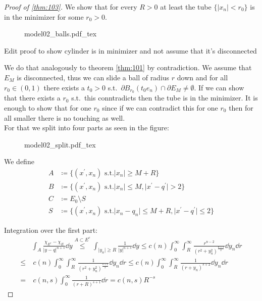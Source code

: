 \begin{proof}[Proof of \cref{thm:103}]
	We show that for every \( R > 0 \) at least the tube \( \{ \lvert x_n \rvert < r_0 \}
	\) is in the minimizer for some \( r_0 > 0 \). \\
	\begin{figure}[h]
		\centering
		\def\svgwidth{0.5\textwidth}
		{model02_balls.pdf_tex}
		\caption{}
		\label{fig:105}
	\end{figure}
	\begin{TODO}
		Edit proof to show cylinder is in minimizer and not assume that it's disconnected
	\end{TODO}
	We do that analogously to theorem \cref{thm:101} by contradiction. We assume that \(
	E_M \) is disconnected, thus we can slide a ball of radius \( r \) down and for all \(
	r_0 \in (0,1) \) there exists a \( t_0 > 0 \) s.t.\ \( \partial B_{r_0}(t_0 e_n) \cap
	\partial E_M \neq \emptyset \). If we can show that there exists a \( r_0 \) s.t.\
	this conntradicts then the tube is in the minimizer. It is enough to show that for one
	\( r_0 \) since if we can contradict this for one \( r_0 \) then for all smaller there
	is no touching as well. \\
	For that we split into four parts as seen in the figure:

	\begin{figure}[h]
		\centering
		\def\svgwidth{0.5\textwidth}
		{model02_split.pdf_tex}
		\caption{}
		\label{fig:106}
	\end{figure}
	We define
	\begin{align*}
		A & \coloneqq \{(x^\prime,x_n) \text{ s.t.} \lvert x_n \rvert \geq M+R \} \\
		B & \coloneqq \{(x^\prime,x_n) \text{ s.t.} \lvert x_n \rvert \leq M, \lvert x^\prime -q^\prime \rvert > 2 \} \\
		C & \coloneqq E_0 \setminus S \\
		S & \coloneqq \{ (x^\prime,x_n) \text{ s.t.} \lvert x_n - q_n \rvert \leq M+R, \lvert x^\prime -q^\prime \rvert \leq 2\}
	\end{align*}

	Integration over the first part:
	\begin{align*}
		     & \int_A \frac{\chi_{E^c} -\chi_E}{\lvert y-q\rvert^{n+s}} \dd{y} \overset{A \subset E^c}{ \leq} \int_{\lvert y_n \rvert \geq R} \frac{1}{\lvert y \rvert^{n+s}} \dd{y} \leq c(n) \int_0^\infty \int_R^\infty \frac{r^{n-2}}{(r^2 +y_n^2)^{\frac{n+s}{2}}} \dd{y_n} \dd{r} \\
		\leq & \ c(n) \int_0^\infty \int_R^\infty \frac{1}{(r^2 +y_n^2)^{\frac{s+2}{2}}} \dd{y_n} \dd{r} \leq c(n) \int_0^\infty \int_R^\infty \frac{1}{(r+y_n)^{s+2}} \dd{y_n} \dd{r} \\
		=    & \ c(n,s) \int_0^\infty \frac{1}{(r+R)^{s+1}} \dd{r} = c(n,s) R^{-s}
	\end{align*}


\end{proof}
